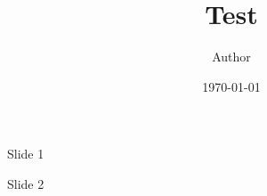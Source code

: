 \documentclass[10pt,t]{beamer}
\title{Test}
\author{Author}
\date{\today}
\begin{document}
	\begin{frame}
		\titlepage 
	\end{frame}


\begin{frame}
	Slide 1
\end{frame}


\begin{frame}
	Slide 2
\end{frame}
\end{document}
